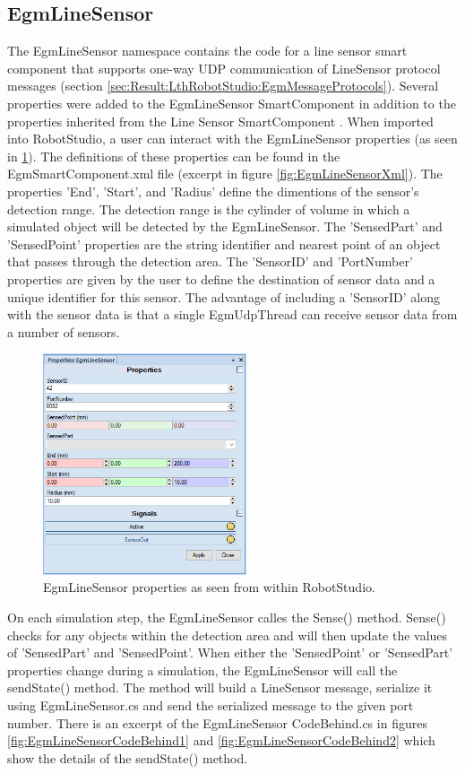 \documentclass{cslthse-msc}
\begin{document}
\subsection{EgmLineSensor}
\label{sec:Result:LthRobotStudio:EgmLineSensor}
The EgmLineSensor namespace contains the code for a line sensor smart component that supports one-way UDP communication of LineSensor protocol messages (section \ref{sec:Result:LthRobotStudio:EgmMessageProtocols}). Several properties were added to the EgmLineSensor SmartComponent in addition to the properties inherited from the Line Sensor SmartComponent \cite{ABB:Line_Sensor}. When imported into RobotStudio, a user can interact with the EgmLineSensor properties (as seen in \ref{fig:egm_line_sensor_properties}). The definitions of these properties can be found in the EgmSmartComponent.xml file (excerpt in figure \ref{fig:EgmLineSensorXml}). The properties 'End', 'Start', and 'Radius' define the dimentions of the sensor's detection range. The detection range is the cylinder of volume in which a simulated object will be detected by the EgmLineSensor. The 'SensedPart' and 'SensedPoint' properties are the string identifier and nearest point of an object that passes through the detection area. The 'SensorID' and 'PortNumber' properties are given by the user to define the destination of sensor data and a unique identifier for this sensor. The advantage of including a 'SensorID' along with the sensor data is that a single EgmUdpThread can receive sensor data from a number of sensors. 

\begin{figure}[H]
    \centering
    \includegraphics[width=6cm]{line_sensor_properties.png}
    \caption{EgmLineSensor properties as seen from within RobotStudio.}
    \label{fig:egm_line_sensor_properties}
\end{figure}

On each simulation step, the EgmLineSensor calles the Sense() method. Sense() checks for any objects within the detection area and will then update the values of 'SensedPart' and 'SensedPoint'. When either the 'SensedPoint' or 'SensedPart' properties change during a simulation, the EgmLineSensor will call the sendState() method. The method will build a LineSensor message, serialize it using EgmLineSensor.cs and send the serialized message to the given port number. There is an excerpt of the EgmLineSensor CodeBehind.cs in figures \ref{fig:EgmLineSensorCodeBehind1} and \ref{fig:EgmLineSensorCodeBehind2} which show the details of the sendState() method. \par
\end{document}
